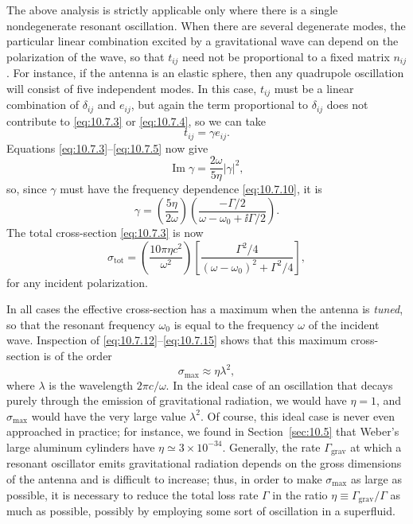 The above analysis is strictly applicable only where there is a single
nondegenerate resonant oscillation. When there are several degenerate modes,
the particular linear combination excited by a gravitational wave can depend
on the polarization of the wave, so that \(t_{ij}\) need not be proportional
to a fixed matrix \(n_{ij}\). For instance, if the antenna is an elastic
sphere, then any quadrupole oscillation will consist of five independent
modes. In this case, \(t_{ij}\) must be a linear combination of
\(\delta_{ij}\) and \(e_{ij}\), but again the term proportional to
\(\delta_{ij}\) does not contribute to \eqref{eq:10.7.3} or
\eqref{eq:10.7.4}, so we can take
\[
  t_{ij}=\gamma e_{ij}.
\]
Equations \eqref{eq:10.7.3}--\eqref{eq:10.7.5} now give
\[
  \operatorname{Im}\gamma=\frac{2\omega}{5\eta}\lvert\gamma\rvert^2,
\]
so, since \(\gamma\) must have the frequency dependence
\eqref{eq:10.7.10}, it is
\[
  \gamma
  =
  \left(\frac{5\eta}{2\omega}\right)
  \left(
    \frac{-\Gamma/2}{\omega-\omega_0+\ii\Gamma/2}
  \right).
\]
The total cross-section \eqref{eq:10.7.3} is now
\begin{equation}
  \sigma_{\mathrm{tot}}
  =
  \left(\frac{10\pi\eta c^2}{\omega^2}\right)
  \left[
    \frac{\Gamma^2/4}
    {(\omega-\omega_0)^2+\Gamma^2/4}
  \right],
  \tag{10.7.15}\label{eq:10.7.15}
\end{equation}
for any incident polarization.

In all cases the effective cross-section has a maximum when the antenna is
\emph{tuned}, so that the resonant frequency \(\omega_0\) is equal to the
frequency \(\omega\) of the incident wave. Inspection of
\eqref{eq:10.7.12}--\eqref{eq:10.7.15} shows that this maximum
cross-section is of the order
\begin{equation}
  \sigma_{\max}\approx\eta\lambda^2,
  \tag{10.7.16}\label{eq:10.7.16}
\end{equation}
where \(\lambda\) is the wavelength \(2\pi c/\omega\). In the ideal case of
an oscillation that decays purely through the emission of gravitational
radiation, we would have \(\eta=1\), and \(\sigma_{\max}\) would have the
very large value \(\lambda^2\). Of course, this ideal case is never even
approached in practice; for instance, we found in Section~\ref{sec:10.5} that
Weber's large aluminum cylinders have
\(\eta\simeq3\times10^{-34}\). Generally, the rate \(\Gamma_{\mathrm{grav}}\)
at which a resonant oscillator emits gravitational radiation depends on the
gross dimensions of the antenna and is difficult to increase; thus, in order
to make \(\sigma_{\max}\) as large as possible, it is necessary to reduce the
total loss rate \(\Gamma\) in the ratio
\(\eta\equiv\Gamma_{\mathrm{grav}}/\Gamma\) as much as possible, possibly by
employing some sort of oscillation in a superfluid.

